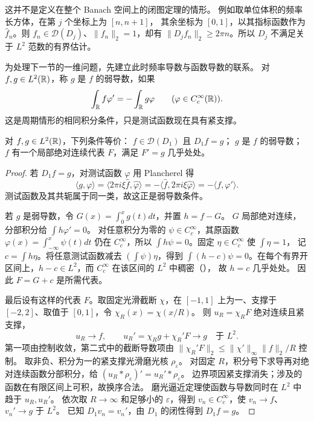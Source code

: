 这并不是定义在整个 Banach 空间上的闭图定理的情形。
例如取单位体积的频率长方体，在第 \(j\) 个坐标上为 \([n,n+1]\)，
其余坐标为 \([0,1]\)，以其指标函数作为 \(\widehat f_n\)。则
\(f_n\in\mathcal D(D_j)\)、\(\|f_n\|_2=1\)，却有
\(\|D_jf_n\|_2\ge2\pi n\)。所以 \(D_j\) 不满足关于 \(L^2\) 范数的有界估计。

为处理下一节的一维问题，先建立此时频率导数与函数导数的联系。
对 \(f,g\in L^2(\mathbb{R})\)，称 \(g\) 是 \(f\) 的弱导数，如果
\[
 \int_{\mathbb{R}} f\varphi'=-\int_{\mathbb{R}} g\varphi
 \qquad(\varphi\in C_c^\infty(\mathbb{R})).
\]
这是周期情形的相同积分条件，只是测试函数现在具有紧支撑。

\begin{proposition}\label{prop:fourier-derivative-ac-line}
对 \(f,g\in L^2(\mathbb{R})\)，下列条件等价：
\(f\in\mathcal D(D_1)\) 且 \(D_1f=g\)；
\(g\) 是 \(f\) 的弱导数；
\(f\) 有一个局部绝对连续代表 \(F\)，满足 \(F'=g\) 几乎处处。
\end{proposition}
\begin{proof}
若 \(D_1f=g\)，对测试函数 \(\varphi\) 用 Plancherel 得
\[
 \langle g,\varphi\rangle
 =\langle2\pi i\xi\widehat f,\widehat\varphi\rangle
 =-\langle\widehat f,2\pi i\xi\widehat\varphi\rangle
 =-\langle f,\varphi'\rangle.
\]
测试函数及其共轭属于同一类，故这正是弱导数条件。

若 \(g\) 是弱导数，令 \(G(x)=\int_0^xg(t)dt\)，并置 \(h=f-G\)。
\(G\) 局部绝对连续，分部积分给 \(\int h\varphi'=0\)。
对任意积分为零的 \(\psi\in C_c^\infty\)，其原函数
\(\varphi(x)=\int_{-\infty}^x\psi(t)dt\) 仍在 \(C_c^\infty\)，所以
\(\int h\psi=0\)。固定 \(\eta\in C_c^\infty\) 使 \(\int\eta=1\)，
记 \(c=\int h\eta\)。将任意测试函数减去 \((\int\psi)\eta\)，得到
\(\int(h-c)\psi=0\)。在每个有界开区间上，\(h-c\in L^2\)，而
\(C_c^\infty\) 在该区间的 \(L^2\) 中稠密（），
故 \(h=c\) 几乎处处。
因此 \(F=G+c\) 是所需代表。

最后设有这样的代表 \(F\)。取固定光滑截断 \(\chi\)，在 \([-1,1]\)
上为一、支撑于 \([-2,2]\)、取值于 \([0,1]\)，令 \(\chi_R(x)=\chi(x/R)\)。
则 \(u_R=\chi_RF\) 绝对连续且紧支撑，
\[
 u_R\to f,\qquad u_R'=\chi_Rg+\chi_R'F\to g\quad\text{于 }L^2.
\]
第一项由控制收敛，第二式中的截断导数项由
\(\|\chi_R'F\|_2\le\|\chi'\|_\infty\|f\|_2/R\) 控制。
取非负、积分为一的紧支撑光滑磨光核 \(\rho_\varepsilon\)。
对固定 \(R\)，积分号下求导再对绝对连续函数分部积分，给
\((u_R*\rho_\varepsilon)'=u_R'*\rho_\varepsilon\)。
边界项因紧支撑消失；涉及的函数在有限区间上可积，故换序合法。
磨光逼近定理使函数与导数同时在 \(L^2\) 中趋于 \(u_R,u_R'\)。
依次取 \(R\to\infty\) 和足够小的 \(\varepsilon\)，得到
\(v_n\in C_c^\infty\)，使 \(v_n\to f\)、\(v_n'\to g\) 于 \(L^2\)。
已知 \(D_1v_n=v_n'\)，由 \(D_1\) 的闭性得到 \(D_1f=g\)。
\end{proof}

